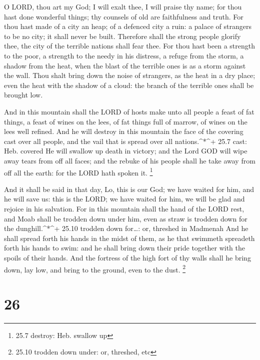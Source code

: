 O LORD, thou art my God; I will exalt thee, I will praise
thy name; for thou hast done wonderful things; thy counsels of old are
faithfulness and truth.  For thou hast made of a city an
heap; of a defenced city a ruin: a palace of strangers to be no city; it
shall never be built.  Therefore shall the strong people
glorify thee, the city of the terrible nations shall fear thee.
 For thou hast been a strength to the poor, a strength to
the needy in his distress, a refuge from the storm, a shadow from the
heat, when the blast of the terrible ones is as a storm against the
wall.  Thou shalt bring down the noise of strangers, as the
heat in a dry place; even the heat with the shadow of a cloud: the
branch of the terrible ones shall be brought low.

 And in this mountain shall the LORD of hosts make unto all
people a feast of fat things, a feast of wines on the lees, of fat
things full of marrow, of wines on the lees well refined. 
And he will destroy in this mountain the face of the covering cast over
all people, and the vail that is spread over all nations.\^{}*\^{}+ 25.7
cast: Heb. covered  He will swallow up death in victory; and
the Lord GOD will wipe away tears from off all faces; and the rebuke of
his people shall he take away from off all the earth: for the LORD hath
spoken it. \footnote{25.7 destroy: Heb. swallow up}

 And it shall be said in that day, Lo, this is our God; we
have waited for him, and he will save us: this is the LORD; we have
waited for him, we will be glad and rejoice in his salvation.
 For in this mountain shall the hand of the LORD rest, and
Moab shall be trodden down under him, even as straw is trodden down for
the dunghill.\^{}*\^{}+ 25.10 trodden down for\ldots: or, threshed in
Madmenah  And he shall spread forth his hands in the midst
of them, as he that swimmeth spreadeth forth his hands to swim: and he
shall bring down their pride together with the spoils of their hands.
 And the fortress of the high fort of thy walls shall he
bring down, lay low, and bring to the ground, even to the dust.
\footnote{25.10 trodden down under: or, threshed, etc}

\hypertarget{section-25}{%
\section{26}\label{section-25}}


